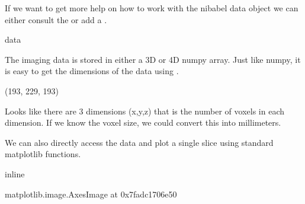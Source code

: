 \documentclass[letterpaper,10pt,english]{sphinxmanual}
\begin{document}
If we want to get more help on how to work with the nibabel data object we can either consult the  or add a .

\begin{sphinxVerbatim}[commandchars=\\\{\}]
data
\end{sphinxVerbatim}

The imaging data is stored in either a 3D or 4D numpy array. Just like numpy, it is easy to get the dimensions of the data using .

\begin{sphinxVerbatim}[commandchars=\\\{\}]
\end{sphinxVerbatim}

\begin{sphinxVerbatim}[commandchars=\\\{\}]
(193, 229, 193)
\end{sphinxVerbatim}

Looks like there are 3 dimensions (x,y,z) that is the number of voxels in each dimension. If we know the voxel size, we could convert this into millimeters.

We can also directly access the data and plot a single slice using standard matplotlib functions.

\begin{sphinxVerbatim}[commandchars=\\\{\}]
 inline

   

\PYG{p}{[}\PYG{p}{]}
\end{sphinxVerbatim}

\begin{sphinxVerbatim}[commandchars=\\\{\}]
\PYGZlt{}matplotlib.image.AxesImage at 0x7fadc1706e50\PYGZgt{}
\end{sphinxVerbatim}

\noindent{}
\end{document}
